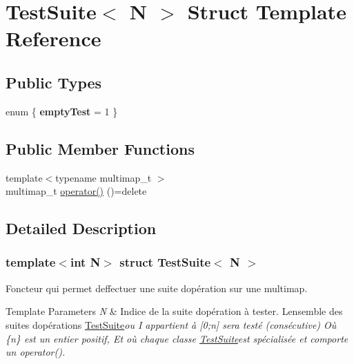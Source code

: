 \hypertarget{structTestSuite}{}\section{Test\+Suite$<$ N $>$ Struct Template Reference}
\label{structTestSuite}
\subsection*{Public Types}
\begin{DoxyCompactItemize}
\item 
\mbox{\label{structTestSuite_a0bc1f544eed95074c61943848b66ba11}} 
enum \{ {\bfseries empty\+Test} = 1
 \}
\end{DoxyCompactItemize}
\subsection*{Public Member Functions}
\begin{DoxyCompactItemize}
\item 
{\footnotesize template$<$typename multimap\+\_\+t $>$ }\\multimap\+\_\+t \hyperlink{structTestSuite_a791fd382a8eb4d1f4f8d75369d3125dd}{operator()} ()=delete
\end{DoxyCompactItemize}


\subsection{Detailed Description}
\subsubsection*{template$<$int N$>$\newline
struct Test\+Suite$<$ N $>$}

Foncteur qui permet d\textquotesingle{}effectuer une suite d\textquotesingle{}opération sur une multimap. 
\begin{DoxyTemplParams}{Template Parameters}
{\em N} & Indice de la suite d\textquotesingle{}opération à tester. L\textquotesingle{}ensemble des suites d\textquotesingle{}opérations \hyperlink{structTestSuite}{Test\+Suite}{\itshape  ou I appartient à \mbox{[}0;n\mbox{]} sera testé (consécutive) Où \{n\} est un entier positif, Et où chaque classe \hyperlink{structTestSuite}{Test\+Suite}{\itshape  est spécialisée et comporte un operator(). }}\\
\hline
\end{DoxyTemplParams}


